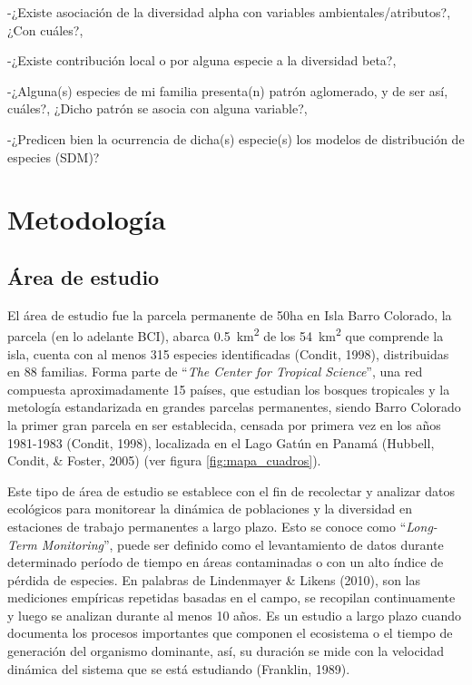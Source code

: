 \documentclass[11pt,]{article}
\begin{document}
-¿Existe asociación de la diversidad alpha con variables
ambientales/atributos?, ¿Con cuáles?,

-¿Existe contribución local o por alguna especie a la diversidad beta?,

-¿Alguna(s) especies de mi familia presenta(n) patrón aglomerado, y de
ser así, cuáles?, ¿Dicho patrón se asocia con alguna variable?,

-¿Predicen bien la ocurrencia de dicha(s) especie(s) los modelos de
distribución de especies (SDM)?

\section{Metodología}\label{metodologuxeda}

\subsection{Área de estudio}\label{uxe1rea-de-estudio}

El área de estudio fue la parcela permanente de 50ha en Isla Barro
Colorado, la parcela (en lo adelante BCI), abarca
0.5~km\textsuperscript{2} de los 54~km\textsuperscript{2} que comprende
la isla, cuenta con al menos 315 especies identificadas (Condit, 1998),
distribuidas en 88 familias. Forma parte de ``\emph{The Center for
Tropical Science}'', una red compuesta aproximadamente 15 países, que
estudian los bosques tropicales y la metología estandarizada en grandes
parcelas permanentes, siendo Barro Colorado la primer gran parcela en
ser establecida, censada por primera vez en los años 1981-1983 (Condit,
1998), localizada en el Lago Gatún en Panamá (Hubbell, Condit, \&
Foster, 2005) (ver figura \ref{fig:mapa_cuadros}).

Este tipo de área de estudio se establece con el fin de recolectar y
analizar datos ecológicos para monitorear la dinámica de poblaciones y
la diversidad en estaciones de trabajo permanentes a largo plazo. Esto
se conoce como ``\emph{Long-Term Monitoring}'', puede ser definido como
el levantamiento de datos durante determinado período de tiempo en áreas
contaminadas o con un alto índice de pérdida de especies. En palabras de
Lindenmayer \& Likens (2010), son las mediciones empíricas repetidas
basadas en el campo, se recopilan continuamente y luego se analizan
durante al menos 10 años. Es un estudio a largo plazo cuando documenta
los procesos importantes que componen el ecosistema o el tiempo de
generación del organismo dominante, así, su duración se mide con la
velocidad dinámica del sistema que se está estudiando (Franklin, 1989).
\end{document}

